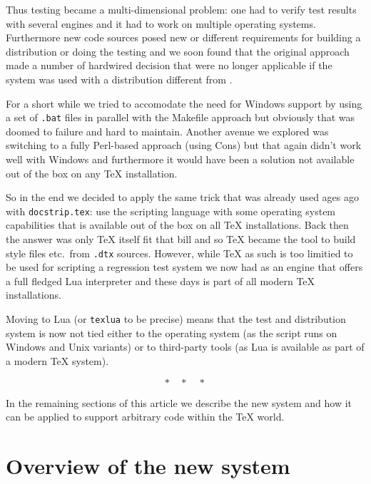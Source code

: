\documentclass[a4paper]{ltugboat}
\begin{document}
Thus testing became a multi-dimensional problem: one had to verify
test results with several engines and it had to work on multiple
operating systems. Furthermore new code sources posed new or different
requirements for building a distribution or doing the testing and
we soon found that the original approach made a number of hardwired
decision that were no longer applicable if the system was used with a
distribution different from \LaTeXe{}.

For a short while we tried to accomodate the need for Windows support
by using a set of \texttt{.bat} files in parallel with the Makefile
approach but obviously that was doomed to failure and hard to
maintain. Another avenue we explored was switching to a fully
Perl-based approach (using Cons) but that again didn't work well with
Windows and furthermore it would have been a solution not available
out of the box on any \TeX{} installation.

So in the end we decided to apply the same trick that was already used
ages ago with \texttt{docstrip.tex}: use the scripting language with
some operating system capabilities that is available out of the box on
all \TeX{} installations. Back then the answer was only \TeX{} itself
fit that bill and so \TeX{} became the tool to build style files
etc.\ from \texttt{.dtx} sources. However, while \TeX{} as such is too
limitied to be used for scripting a regression test system we now had
\luaTeX{} as an engine that offers a full fledged Lua interpreter\Dash
and these days \luaTeX{} is part of all modern \TeX{} installations.

Moving to Lua (or \texttt{texlua} to be precise) means that the test
and distribution system is now not tied either to the operating system
(as the script runs on Windows and Unix variants) or to third-party
tools (as Lua is available as part of a modern \TeX{} system).

\[
  * \quad * \quad *
\]

In the remaining sections of this article we describe the new system
and how it can be applied to support arbitrary code within the \TeX{}
world.

\section{Overview of the new system}
\label{sec:overview}
\end{document}
